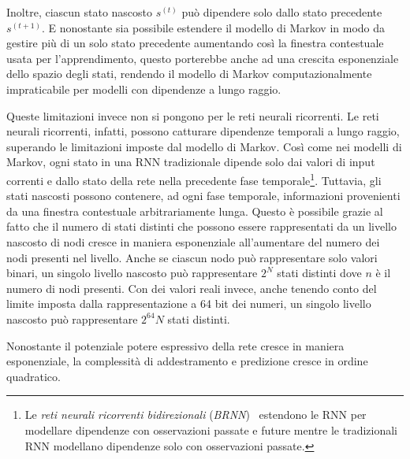 Inoltre, ciascun stato nascosto $s^{(t)}$ pu\`o dipendere solo dallo stato
precedente $s^{(t+1)}$. E nonostante sia possibile estendere il modello di Markov
in modo da gestire pi\`u di un solo stato precedente aumentando cos\`i la finestra
contestuale usata per l'apprendimento, questo porterebbe anche ad una crescita
esponenziale dello spazio degli stati, rendendo il modello di Markov computazionalmente
impraticabile per modelli con dipendenze a lungo raggio.

Queste limitazioni invece non si pongono per le reti neurali ricorrenti. Le reti
neurali ricorrenti, infatti, possono catturare dipendenze temporali a lungo raggio,
superando le limitazioni imposte dal modello di Markov. Cos\`i come nei modelli
di Markov, ogni stato in una RNN tradizionale dipende solo dai valori di input
correnti e dallo stato della rete nella precedente fase temporale\footnote{Le
\emph{reti neurali ricorrenti bidirezionali} (\emph{BRNN})~\cite{Schuster:1997}
estendono le RNN per modellare dipendenze con osservazioni passate e future mentre
le tradizionali RNN modellano dipendenze solo con osservazioni passate.}. Tuttavia,
gli stati nascosti possono contenere, ad ogni fase temporale, informazioni
provenienti da una finestra contestuale arbitrariamente lunga. Questo \`e possibile
grazie al fatto che il numero di stati distinti che possono essere rappresentati
da un livello nascosto di nodi cresce in maniera esponenziale all'aumentare del
numero dei nodi presenti nel livello. Anche se ciascun nodo pu\`o rappresentare
solo valori binari, un singolo livello nascosto pu\`o rappresentare $2^N$ stati
distinti dove $n$ \`e il numero di nodi presenti. Con dei valori reali invece,
anche tenendo conto del limite imposta dalla rappresentazione a 64 bit dei numeri,
un singolo livello nascosto pu\`o rappresentare $2^64N$ stati distinti.

Nonostante il potenziale potere espressivo della rete cresce in maniera esponenziale,
la complessit\`a di addestramento e predizione cresce in ordine quadratico.

